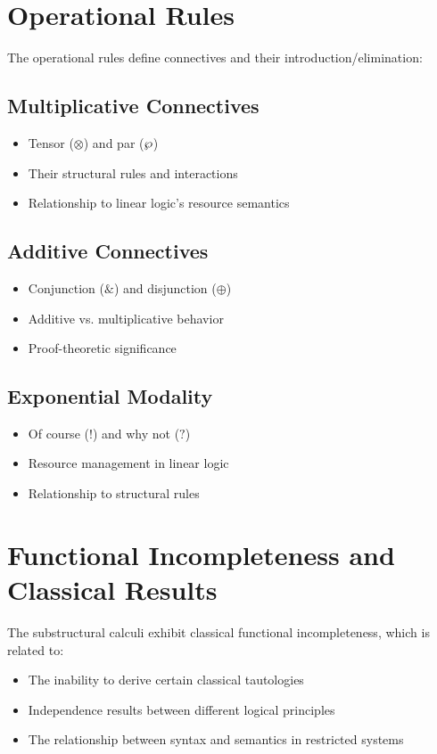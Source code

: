 \section*{Operational Rules}
The operational rules define connectives and their introduction/elimination:

\subsection*{Multiplicative Connectives}
\begin{itemize}
    \item Tensor ($\otimes$) and par ($\mathbin{\wp}$)
    \item Their structural rules and interactions
    \item Relationship to linear logic's resource semantics
\end{itemize}

\subsection*{Additive Connectives}
\begin{itemize}
    \item Conjunction ($\&$) and disjunction ($\oplus$)
    \item Additive vs. multiplicative behavior
    \item Proof-theoretic significance
\end{itemize}

\subsection*{Exponential Modality}
\begin{itemize}
    \item Of course ($!$) and why not ($?$)
    \item Resource management in linear logic
    \item Relationship to structural rules
\end{itemize}

\section*{Functional Incompleteness and Classical Results}
The substructural calculi exhibit classical functional incompleteness, which is related to:

\begin{itemize}
    \item The inability to derive certain classical tautologies
    \item Independence results between different logical principles
    \item The relationship between syntax and semantics in restricted systems
\end{itemize}


